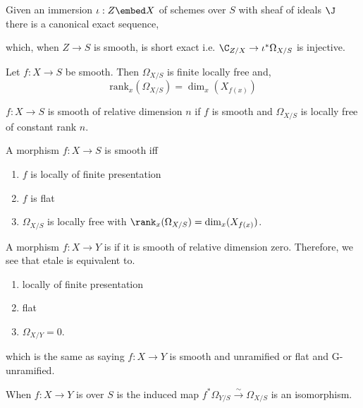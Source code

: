 \documentclass[12pt]{article}
\begin{document}
\begin{prop}
Given an immersion $\iota : Z \embed X$ of schemes over $S$ with sheaf of ideals $\J$ there is a canonical exact sequence,
\begin{center}
\end{center}
which, when $Z \to S$ is smooth, is short exact i.e. $\C_{Z/X} \to \iota^* \Omega_{X/S}$ is injective.
\end{prop}

\begin{prop}
Let $f : X \to S$ be smooth. Then $\Omega_{X/S}$ is finite locally free and,
\[ \mathrm{rank}_x(\Omega_{X/S}) = \dim_x (X_{f(x)}) \]
\end{prop}

\begin{defn}
$f : X \to S$ is smooth of relative dimension $n$ if $f$ is smooth and $\Omega_{X/S}$ is locally free of constant rank $n$. 
\end{defn}

\begin{prop}
A morphism $f : X \to S$ is smooth iff 
\begin{enumerate}
\item $f$ is locally of finite presentation
\item $f$ is flat
\item $\Omega_{X/S}$ is locally free with $\rank_x(\Omega_{X/S}) = \dim_x(X_{f(x)})$. 
\end{enumerate}
\end{prop}

\begin{defn}
A morphism $f : X \to Y$ is \textit{\etale} if it is smooth of relative dimension zero. Therefore, we see that etale is equivalent to.
\begin{enumerate}
\item locally of finite presentation
\item flat
\item $\Omega_{X/Y} = 0$.
\end{enumerate}
which is the same as saying $f : X \to Y$ is smooth and unramified or flat and G-unramified.
\end{defn}

\begin{prop}
When $f : X \to Y$ is over $S$ is \etale the induced map $f^* \Omega_{Y/S} \xrightarrow{\sim} \Omega_{X/S}$ is an isomorphism.
\end{prop}
\end{document}
